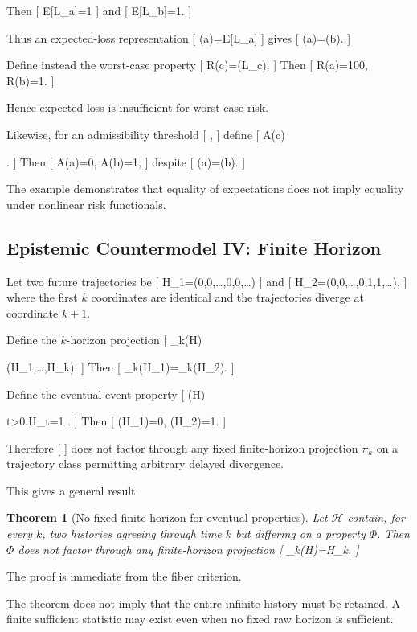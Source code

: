 \documentclass[11pt]{article}
\newtheorem{theorem}{Theorem} \newtheorem{proposition}{Proposition} \newtheorem{lemma}{Lemma} \newtheorem{corollary}{Corollary} \newtheorem{definition}{Definition} \newtheorem{remark}{Remark}
\newcommand{\Hist}{\mathcal{H}} \newcommand{\States}{\mathcal{S}} \newcommand{\Actions}{\mathcal{A}} \newcommand{\Obs}{\mathcal{O}} \newcommand{\Img}{\operatorname{Im}}
\begin{document}
Then
[
\mathbb E[L_a]=1
]
and
[
\mathbb E[L_b]=1.
]

Thus an expected-loss representation
[
\pi(a)=\mathbb E[L_a]
]
gives
[
\pi(a)=\pi(b).
]

Define instead the worst-case property
[
R(c)=\sup{}(L_c).
]
Then
[
R(a)=100,
\qquad
R(b)=1.
]

Hence expected loss is insufficient for worst-case risk.

Likewise, for an admissibility threshold
[
,
]
define
[
A(c)

.
]
Then
[
A(a)=0,
\qquad
A(b)=1,
]
despite
[
\pi(a)=\pi(b).
]

The example demonstrates that equality of expectations does not imply equality under nonlinear risk functionals.

\subsection{Epistemic Countermodel IV: Finite Horizon}

Let two future trajectories be
[
H_1=(0,0,\ldots,0,0,\ldots)
]
and
[
H_2=(0,0,\ldots,0,1,1,\ldots),
]
where the first $k$ coordinates are identical and the trajectories diverge at coordinate $k+1$.

Define the $k$-horizon projection
[
\pi_k(H)

(H_1,\ldots,H_k).
]
Then
[
\pi_k(H_1)=\pi_k(H_2).
]

Define the eventual-event property
[
\Phi(H)

{
\exists t>0:H_t=1
}.
]
Then
[
\Phi(H_1)=0,
\qquad
\Phi(H_2)=1.
]

Therefore
[
\Phi
]
does not factor through any fixed finite-horizon projection $\pi_k$ on a trajectory class permitting arbitrary delayed divergence.

This gives a general result.

\begin{theorem}[No fixed finite horizon for eventual properties]
Let $\Hist$ contain, for every $k$, two histories agreeing through time $k$ but differing on a property $\Phi$. Then $\Phi$ does not factor through any finite-horizon projection
[
\pi_k(H)=H_{\leq k}.
]
\end{theorem}

The proof is immediate from the fiber criterion.

The theorem does not imply that the entire infinite history must be retained. A finite sufficient statistic may exist even when no fixed raw horizon is sufficient.
\end{document}
